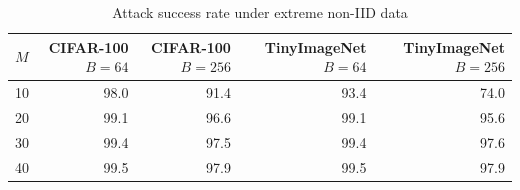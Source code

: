 \begin{table}[htbp]
\centering
\begin{tabular}{lrrrr}
\toprule
$M$ & CIFAR-100 $B=64$ & CIFAR-100 $B=256$ & TinyImageNet $B=64$ & TinyImageNet $B=256$ \\
\midrule
10 & 98.0 & 91.4 & 93.4 & 74.0 \\
20 & 99.1 & 96.6 & 99.1 & 95.6 \\
30 & 99.4 & 97.5 & 99.4 & 97.6 \\
40 & 99.5 & 97.9 & 99.5 & 97.9 \\
\bottomrule
\end{tabular}
\caption{Attack success rate under extreme non-IID data}
\label{tab:table5}
\end{table}

